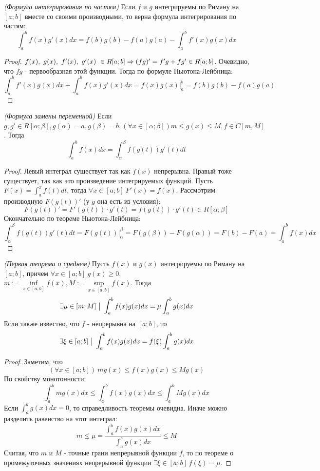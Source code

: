 \begin{corollary} \textit{(Формула интегрирования по частям)}
	Если $f$ и $g$ интегрируемы по Риману на $[a;b]$ вместе со своими производными, то верна формула интегрирования по частям:
	\[
		\int_a^bf(x)g'(x)dx = f(b)g(b) - f(a)g(a) - \int_a^bf'(x)g(x)dx
	\]
\end{corollary}

\begin{proof}
	$\\ f(x),\ g(x),\ f'(x),\ g'(x)\ \in R[a;b] \Ra (fg)'= f'g + fg' \in R[a;b]$.
	Очевидно, что $fg$ - первообразная этой функции. Тогда по формуле Ньютона-Лейбница:
	\[
		\int_a^bf'(x)g(x)dx + \int_a^bf(x)g'(x)dx = f(x)g(x)\Bigg |^b_a = f(b)g(b) - f(a)g(a)
	\]
\end{proof}

\begin{theorem} \textit{(Формула замены переменной)}
	Если $g, g'\in R[\alpha; \beta], g(\alpha)=a, g(\beta)=b, (\forall x \in [\alpha; \beta]) m\leq g(x)\leq M, f\in C[m,M]$. 
	Тогда 
	\[
		\int_a^bf(x)dx = \int_\alpha^\beta f(g(t))g'(t)dt
	\]
\end{theorem}

\begin{proof}
	Левый интеграл существует так как $f(x)$ непрерывна. Правый тоже существует, так как это произведение интегрируемых функций.
	Пусть $F(x) = \int_a^xf(t)dt$, тогда $\forall x \in [a;b]\ F'(x) = f(x)$.
	Рассмотрим производную $F(g(t))'$ (у $g$ она есть из условия):
	\[
		F(g(t))' = F'(g(t))\cdot g'(t) = f(g(t))\cdot g'(t) \in R[\alpha;\beta]
	\]
	Окончательно по теореме Ньютона-Лейбница:
	\[
		\int_\alpha^\beta f(g(t))g'(t)dt = F(g(t)) \Biggr |_\alpha^\beta = F(g(\beta)) - F(g(\alpha))= F(b) - F(a) = \int_a^bf(x)dx
	\]
\end{proof}

\begin{theorem} \textit{(Первая теорема о среднем)}
	Пусть $f(x)$ и $g(x)$ интегрируемы по Риману на $[a;b]$, причем $\forall x \in [a;b]\ g(x) \geq 0$, $m:=\inf\limits_{x\in[a,b]}{f(x)}, M:=\sup\limits_{x\in[a,b]}{f(x)}$. Тогда 
	\[
		\exists \mu \in [m;M] \ \big|\  \int_a^bf(x)g(x)dx = \mu \int_a^bg(x)dx
	\]
	Если также известно, что $f$ - непрерывна на $[a;b]$, то 
	\[
		\exists \xi \in [a;b]\ \big|\  \int_a^bf(x)g(x)dx = f(\xi)\int_a^bg(x)dx
	\]
\end{theorem}

\begin{proof}
	Заметим, что
	\[
		(\forall x\in [a;b])\ mg(x) \leq f(x)g(x) \leq Mg(x)
	\]
	По свойству монотонности:
	\[
		\int_a^b mg(x)dx \leq \int_a^b f(x)g(x)dx \leq \int_a^b Mg(x)dx
	\]
	Если $\int_a^bg(x)dx = 0$, то справедливость теоремы очевидна.
	Иначе можно разделить равенство на этот интеграл:
	\[
		m \leq \mu = \frac{\int_a^b f(x)g(x)dx}{\int_a^b g(x)dx} \leq M
	\]
	Считая, что $m$ и $M$ - точные грани непрерывной функции $f$, то по теореме о промежуточных значениях непрерывной функции $\exists \xi \in [a;b]\ f(\xi) = \mu$.
\end{proof}

